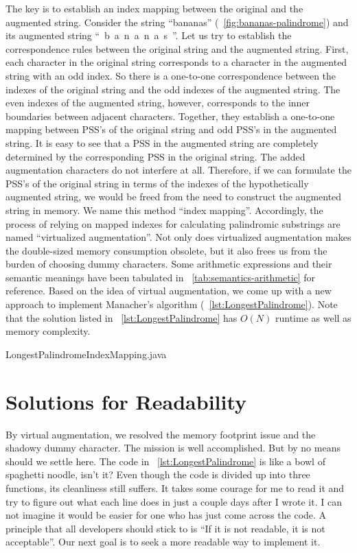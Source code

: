 The key is to establish an index mapping between the original and the augmented string.
Consider the string \mbox{``bananas''} (~\autoref{fig:bananas-palindrome}) and its augmented string
\mbox{`` b a n a n a s ''}.
Let us try to establish the correspondence rules between the original string and the augmented
string.
First, each character in the original string corresponds to a character in the
augmented string with an odd index.
So there is a one-to-one correspondence between the
indexes of the original string and the odd indexes of the augmented string.
The even indexes of the augmented string, however, corresponds to the inner boundaries between
adjacent characters.
Together, they establish a one-to-one mapping between PSS's of the original string and odd
PSS's in the augmented string.
It is easy to see that a PSS in the
augmented string are completely determined by the corresponding PSS in the original string.
The added augmentation characters do not interfere at all.
Therefore, if we can formulate the PSS's of the original string in terms of the indexes of
the hypothetically augmented string, we would be freed from the need to construct the augmented
string in memory.
We name this method ``index mapping''.
Accordingly, the process of relying on mapped indexes for calculating
palindromic substrings are named ``virtualized augmentation''.
Not only does virtualized augmentation makes the double-sized memory consumption obsolete,
but it also frees us from the burden of choosing dummy characters.
Some arithmetic expressions and their semantic meanings have been tabulated in
~\autoref{tab:semantics-arithmetic} for reference.
Based on the idea of virtual augmentation, we come up with a new approach to implement
Manacher's algorithm (~\autoref{lst:LongestPalindrome}).
Note that the solution listed in ~\autoref{lst:LongestPalindrome} has
$O(N)$ runtime as well as memory complexity.


{LongestPalindromeIndexMapping.java}


\section{Solutions for Readability}\label{sec:palindrom.modularized}

By virtual augmentation, we resolved the memory footprint issue and the shadowy dummy character.
The mission is well accomplished.
But by no means should we settle here.
The code in ~\autoref{lst:LongestPalindrome} is like a bowl of spaghetti noodle, isn't it?
Even though the code is divided up into three functions, its cleanliness still suffers.
It takes some courage for me to read it and try to figure out what each line does in just a couple
days after I wrote it.
I can not imagine it would be easier for one who has just come across the code.
A principle that all developers should stick to is
\enquote{If it is not readable, it is not acceptable}.
Our next goal is to seek a more readable way to implement it.


